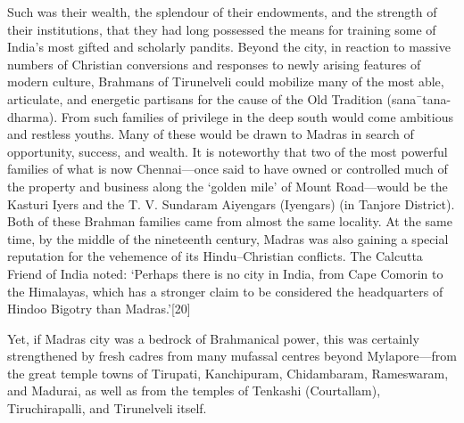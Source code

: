 {Such was their wealth, the splendour of their endowments, and the strength of their institutions, that they had long possessed the means for training some of India’s most gifted and scholarly pandits. Beyond the city, in reaction to massive numbers of Christian conversions and responses to newly arising features of modern culture, Brahmans of Tirunelveli could mobilize many of the most able, articulate, and energetic partisans for the cause of the Old Tradition (sana¯tana-dharma). From such families of privilege in the deep south would come ambitious and restless youths. Many of these would be drawn to Madras in search of opportunity, success, and wealth. It is noteworthy that two of the most powerful families of what is now Chennai—once said to have owned or controlled much of the property and business along the ‘golden mile’ of Mount Road—would be the Kasturi Iyers and the T. V. Sundaram Aiyengars (Iyengars) (in Tanjore District). Both of these Brahman families came from almost the same locality. At the same time, by the middle of the nineteenth century, Madras was also gaining a special reputation for the vehemence of its Hindu–Christian conflicts. The Calcutta Friend of India noted: ‘Perhaps there is no city in India, from Cape Comorin to the Himalayas, which has a stronger claim to be considered the headquarters of Hindoo Bigotry than Madras.’[20]

Yet, if Madras city was a bedrock of Brahmanical power, this was certainly strengthened by fresh cadres from many mufassal centres beyond Mylapore—from the great temple towns of Tirupati, Kanchipuram, Chidambaram, Rameswaram, and Madurai, as well as from the temples of Tenkashi (Courtallam), Tiruchirapalli, and Tirunelveli itself.

}
